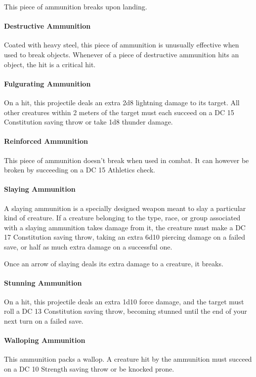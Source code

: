     This piece of ammunition breaks upon landing.
\paragraph{Destructive Ammunition}
    Coated with heavy steel, this piece of ammunition is unusually effective when used to break objects.
    Whenever of a piece of destructive ammunition hits an object, the hit is a critical hit.
\paragraph{Fulgurating Ammunition}
    On a hit, this projectile deals an extra 2d8 lightning damage to its target.
    All other creatures within 2 meters of the target must each succeed on a DC 15 Constitution saving throw or take 1d8 thunder damage.
\paragraph{Reinforced Ammunition}
    This piece of ammunition doesn't break when used in combat.
    It can however be broken by succeeding on a DC 15 Athletics check.
\paragraph{Slaying Ammunition}
    A slaying ammunition is a specially designed weapon meant to slay a particular kind of creature.
    If a creature belonging to the type, race, or group associated with a slaying ammunition takes damage from it, the creature must make a DC 17 Constitution saving throw, taking an extra 6d10 piercing damage on a failed save, or half as much extra damage on a successful one.

    Once an arrow of slaying deals its extra damage to a creature, it breaks.
\paragraph{Stunning Ammunition}
    On a hit, this projectile deals an extra 1d10 force damage, and the target must roll a DC 13 Constitution saving throw, becoming stunned until the end of your next turn on a failed save.
\paragraph{Walloping Ammunition}
    This ammunition packs a wallop.
    A creature hit by the ammunition must succeed on a DC 10 Strength saving throw or be knocked prone.
\pagebreak
